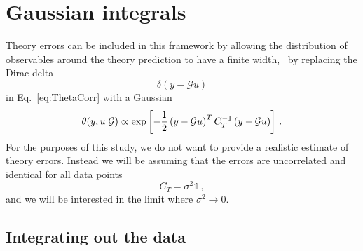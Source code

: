 \section{Gaussian integrals}
\label{sec:GaussianIntegrals}

Theory errors can be included in this framework by allowing the distribution of
observables around the theory prediction to have a finite width, \eg\ by
replacing the Dirac delta 
\begin{equation}
    \label{eq:DiracInApp}
    \delta(y-\mathcal{G}u)
\end{equation}
in Eq.~\ref{eq:ThetaCorr} with a Gaussian
\begin{equation}
    \label{eq:TheoryGaussian}
    \theta(y,u|\mathcal{G}) \propto \exp\left[
        -\frac12 \left(y-\mathcal{G}u\right)^T
        C_T^{-1} \left(y-\mathcal{G}u\right)
    \right]\, .
\end{equation}
For the purposes of this study, we do not want to provide a realistic estimate
of theory errors. Instead we will be assuming that the errors are uncorrelated
and identical for all data points
\begin{equation}
    \label{eq:DiagTheoryCov}
    C_T = \sigma^2 \mathds{1}\, ,
\end{equation}
and we will be interested in the limit where $\sigma^2\to 0$. 

\subsection{Integrating out the data}
\label{sec:IntOutData}

